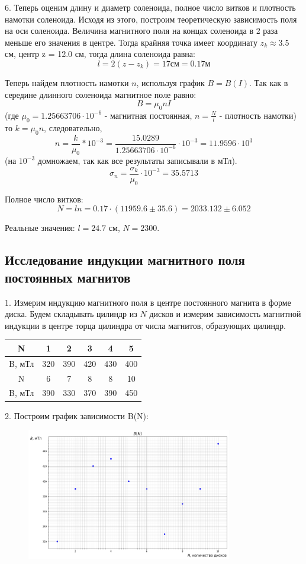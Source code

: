 \documentclass[a4paper]{article}
\begin{document}
    6. Теперь оценим длину и диаметр соленоида, полное число витков и плотность намотки соленоида. Исходя из этого, построим теоретическую зависимость поля на оси соленоида.
    Величина магнитного поля на концах соленоида в 2 раза меньше его значения в центре. Тогда крайняя точка имеет координату $z_{k} \approx 3.5$ см, центр z = 12.0 см, тогда длина соленоида равна:
    \[ l = 2(z - z_{k}) = 17 \text{см} = 0.17 \text{м}\]
    
    Теперь найдем плотность намотки $n$, используя график $B = B(I)$.
    Так как в середине длинного соленоида магнитное поле равно:
    \[ B = \mu_{0} n I \]
    (где $\mu_{0} = 1.25663706 \cdot 10^{-6}$ - магнитная постоянная, $n = \frac{N}{l}$ - плотность намотки) то $k = \mu_{0} n $, следовательно,
    \[ n = \frac{k}{\mu_{0}} * 10^{-3} = \frac{15.0289}{1.25663706 \cdot 10^{-6}} \cdot 10^{-3} = 11.9596 \cdot 10^{3}\]
    (на $10^{-3}$ домножаем, так как все результаты записывали в мТл).
    \[ \sigma_{n} = \frac{\sigma_{k}}{\mu_{0}} \cdot 10^{-3} = 35.5713\]
    
    Полное число витков:
    \[ N = ln = 0.17 \cdot (11959.6 \pm 35.6) = 2033.132 \pm 6.052\]
    
    Реальные значения: $l = 24.7$ см, $N = 2300$.

\subsection{Исследование индукции магнитного поля постоянных магнитов}
1. Измерим индукцию магнитного поля в центре постоянного магнита в форме диска. Будем складывать цилиндр из $N$ дисков и измерим зависимость магнитной индукции в центре торца цилиндра от числа магнитов, образующих цилиндр.

\begin{table}[!htbp]
\centering
	\begin{tabular}{|c|c|c|c|c|c|} \hline
    N & 1 & 2 & 3 & 4 & 5  \\ \hline
    B, мТл & 320 & 390 & 420 & 430 & 400  \\ \hline
    N & 6 & 7 & 8 & 8 & 10 \\ \hline
    B, мТл & 390 & 330 & 370 & 390 & 450 \\ \hline
	\end{tabular}
\end{table}

2. Построим график зависимости B(N):
\begin{figure}[H]
\centering
\includegraphics[width=0.8\textwidth]{1_2_ris3.png}
\end{figure}
\end{document}
